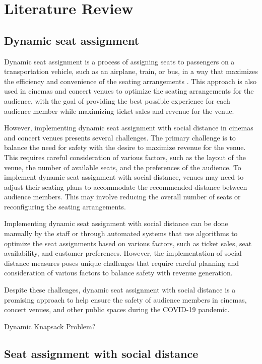 \section{Literature Review}

\subsection{Dynamic seat assignment}
Dynamic seat assignment is a process of assigning seats to passengers on a transportation vehicle, such as an airplane, train, or bus, in a way that maximizes the efficiency and convenience of the seating arrangements \cite{hamdouch2011schedule, berge1993demand}. This approach is also used in cinemas and concert venues to optimize the seating arrangements for the audience, with the goal of providing the best possible experience for each audience member while maximizing ticket sales and revenue for the venue.

However, implementing dynamic seat assignment with social distance in cinemas and concert venues presents several challenges. The primary challenge is to balance the need for safety with the desire to maximize revenue for the venue. This requires careful consideration of various factors, such as the layout of the venue, the number of available seats, and the preferences of the audience. To implement dynamic seat assignment with social distance, venues may need to adjust their seating plans to accommodate the recommended distance between audience members. This may involve reducing the overall number of seats or reconfiguring the seating arrangements.

Implementing dynamic seat assignment with social distance can be done manually by the staff or through automated systems that use algorithms to optimize the seat assignments based on various factors, such as ticket sales, seat availability, and customer preferences. However, the implementation of social distance measures poses unique challenges that require careful planning and consideration of various factors to balance safety with revenue generation.

Despite these challenges, dynamic seat assignment with social distance is a promising approach to help ensure the safety of audience members in cinemas, concert venues, and other public spaces during the COVID-19 pandemic.

Dynamic Knapsack Problem?

\subsection{Seat assignment with social distance}

